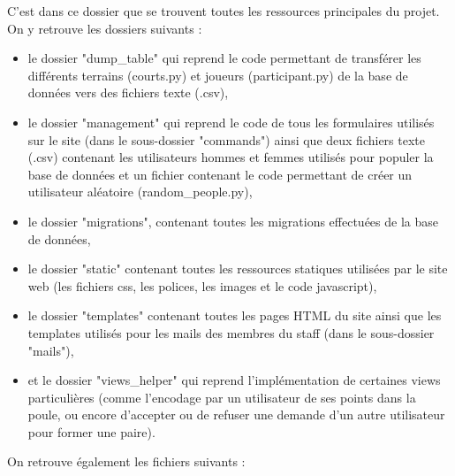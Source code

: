 C'est dans ce dossier que se trouvent toutes les ressources principales du projet. On y retrouve les dossiers suivants :
\begin{itemize}
	\item le dossier "dump\_table" qui reprend le code permettant de transférer les différents terrains (courts.py) et joueurs (participant.py) de la base de données vers des fichiers texte (.csv),
	\item le dossier "management" qui reprend le code de tous les formulaires utilisés sur le site (dans le sous-dossier "commands") ainsi que deux fichiers texte (.csv) contenant les utilisateurs hommes et femmes utilisés pour populer la base de données et un fichier contenant le code permettant de créer un utilisateur aléatoire (random\_people.py),
	\item le dossier "migrations", contenant toutes les migrations effectuées de la base de données,
	\item le dossier "static" contenant toutes les ressources statiques utilisées par le site web (les fichiers css, les polices, les images et le code javascript),
	\item le dossier "templates" contenant toutes les pages HTML du site ainsi que les templates utilisés pour les mails des membres du staff (dans le sous-dossier "mails"),
	\item et le dossier "views\_helper" qui reprend l'implémentation de certaines views particulières (comme l'encodage par un utilisateur de ses points dans la poule, ou encore d'accepter ou de refuser une demande d'un autre utilisateur pour former une paire).\\
\end{itemize}

On retrouve également les fichiers suivants :\\

